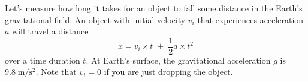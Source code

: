 \documentclass[12pt]{article}%
\newcommand*{\unit}[1]{\;\mathrm{#1}}  %
\begin{document}


Let's measure how long it takes for an object to fall some distance in the Earth's gravitational field.
An object with initial velocity $v_i$ that experiences acceleration $a$ will travel a distance
\begin{equation}
x=v_i \times t \; + \; \frac{1}{2}a \times t^2
\end{equation}
over a time duration $t$. At Earth's surface, the gravitational acceleration $g$ is $9.8 \unit{m/s^2}$. Note that $v_i = 0$ if you are just dropping the object.
\end{document}
